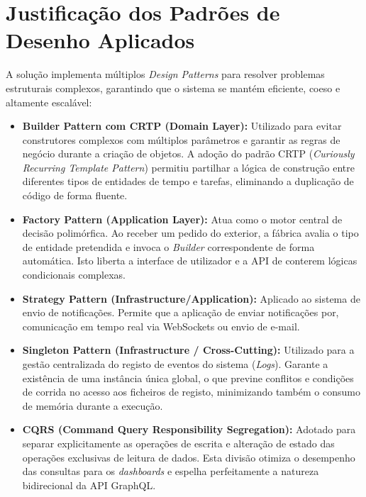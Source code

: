 \documentclass{llncs}
\begin{document}
\section{Justificação dos Padrões de Desenho Aplicados}
A solução implementa múltiplos \textit{Design Patterns} para resolver problemas estruturais complexos, garantindo que o sistema se mantém eficiente, coeso e altamente escalável:

\begin{itemize}
    \item \textbf{Builder Pattern com CRTP (Domain Layer):} Utilizado para evitar construtores complexos com múltiplos parâmetros e garantir as regras de negócio durante a criação de objetos. A adoção do padrão CRTP (\textit{Curiously Recurring Template Pattern}) permitiu partilhar a lógica de construção entre diferentes tipos de entidades de tempo e tarefas, eliminando a duplicação de código de forma fluente.
    
    \item \textbf{Factory Pattern (Application Layer):} Atua como o motor central de decisão polimórfica. Ao receber um pedido do exterior, a fábrica avalia o tipo de entidade pretendida e invoca o \textit{Builder} correspondente de forma automática. Isto liberta a interface de utilizador e a API de conterem lógicas condicionais complexas.
    
    \item \textbf{Strategy Pattern (Infrastructure/Application):} Aplicado ao sistema de envio de notificações. Permite que a aplicação de enviar notificações por, comunicação em tempo real via WebSockets ou envio de e-mail.
    
    \item \textbf{Singleton Pattern (Infrastructure / Cross-Cutting):} Utilizado para a gestão centralizada do registo de eventos do sistema (\textit{Logs}). Garante a existência de uma instância única global, o que previne conflitos e condições de corrida no acesso aos ficheiros de registo, minimizando também o consumo de memória durante a execução.
    
    \item \textbf{CQRS (Command Query Responsibility Segregation):} Adotado para separar explicitamente as operações de escrita e alteração de estado das operações exclusivas de leitura de dados. Esta divisão otimiza o desempenho das consultas para os \textit{dashboards} e espelha perfeitamente a natureza bidirecional da API GraphQL.
\end{itemize}
\end{document}
